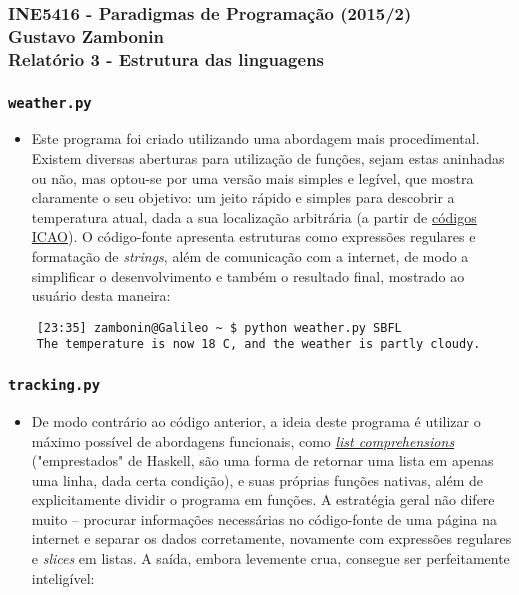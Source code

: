 \documentclass{article}
\begin{document}
\subsubsection*{INE5416 - Paradigmas de Programação (2015/2) \\
    Gustavo Zambonin \\
    Relatório 3 - Estrutura das linguagens
}

\subsubsection*{\texttt{weather.py}}
\begin{itemize}
    \item Este programa foi criado utilizando uma abordagem mais procedimental.
    Existem diversas aberturas para utilização de funções, sejam estas aninhadas
    ou não, mas optou-se por uma versão mais simples e legível, que mostra
    claramente o seu objetivo: um jeito rápido e simples para descobrir a
    temperatura atual, dada a sua localização arbitrária (a partir de
    \href{http://www.airlineupdate.com/content_public/codes/airportcodes/airport_icaocodes/airport_icao.htm}
    {códigos ICAO}). O código-fonte apresenta estruturas como expressões
    regulares e formatação de \textit{strings}, além de comunicação com a
    internet, de modo a simplificar o desenvolvimento e também o resultado
    final, mostrado ao usuário desta maneira:
\end{itemize}

\begin{verbatim}
    [23:35] zambonin@Galileo ~ $ python weather.py SBFL
    The temperature is now 18 C, and the weather is partly cloudy.
\end{verbatim}

\subsubsection*{\texttt{tracking.py}}
\begin{itemize}
    \item De modo contrário ao código anterior, a ideia deste programa é
    utilizar o máximo possível de abordagens funcionais, como
    \href{https://docs.python.org/3/howto/functional.html#generator-expressions-and-list-comprehensions}
    {\textit{list comprehensions}} ("emprestados" de Haskell, são uma forma de
    retornar uma lista em apenas uma linha, dada certa condição), e suas
    próprias funções nativas, além de explicitamente dividir o programa em
    funções. A estratégia geral não difere muito -- procurar informações
    necessárias no código-fonte de uma página na internet e separar os dados
    corretamente, novamente com expressões regulares e \textit{slices} em
    listas. A saída, embora levemente crua, consegue ser perfeitamente
    inteligível:
\end{itemize}
\end{document}
